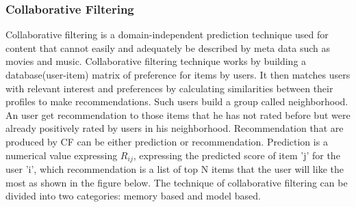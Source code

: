 \subsubsection{Collaborative Filtering}
Collaborative filtering \cite{rmain}is a domain-independent prediction technique used for content that cannot easily and adequately be described by meta data such as movies and music. Collaborative filtering technique works by building a database(user-item) matrix of preference for items by users. It then matches users with relevant interest and preferences by calculating similarities between their profiles to make recommendations. Such users build a group called neighborhood. An user get recommendation to those items that he has not rated before but were already positively rated by users in his neighborhood. Recommendation that are produced by CF can be either prediction or recommendation. Prediction is a numerical value expressing $R_{ij}$, expressing the predicted score of item 'j' for the user 'i', which recommendation is a list of top N items that the user will like the most as shown in the figure below. The technique of collaborative filtering can be divided into two categories: memory based and model based.

